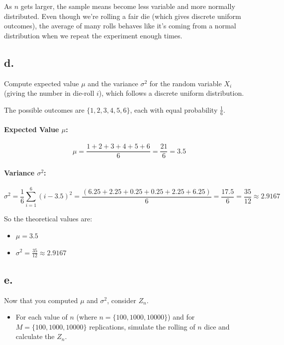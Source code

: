 \documentclass[
]{article}
\providecommand{\tightlist}{%
  \setlength{\itemsep}{0pt}\setlength{\parskip}{0pt}}
\begin{document}
As \(n\) gets larger, the sample means become less variable and more
normally distributed. Even though we're rolling a fair die (which gives
discrete uniform outcomes), the average of many rolls behaves like it's
coming from a normal distribution when we repeat the experiment enough
times.

\subsection{d.~}\label{d.-2}

Compute expected value \(\mu\) and the variance \(\sigma^2\) for the
random variable \(X_i\) (giving the number in die-roll \(i\)), which
follows a discrete uniform distribution.

The possible outcomes are \(\{1, 2, 3, 4, 5, 6\}\), each with equal
probability \(\frac{1}{6}\).

\paragraph{\texorpdfstring{Expected Value
\(\mu\):}{Expected Value \textbackslash mu:}}\label{expected-value-mu}

\[
\mu = \frac{1 + 2 + 3 + 4 + 5 + 6}{6} = \frac{21}{6} = 3.5
\]

\paragraph{\texorpdfstring{Variance
\(\sigma^2\):}{Variance \textbackslash sigma\^{}2:}}\label{variance-sigma2}

\[
\sigma^2 = \frac{1}{6} \sum_{i=1}^{6} (i - 3.5)^2 = \frac{(6.25 + 2.25 + 0.25 + 0.25 + 2.25 + 6.25)}{6} = \frac{17.5}{6} = \frac{35}{12} \approx 2.9167
\]

So the theoretical values are:

\begin{itemize}
\tightlist
\item
  \(\mu = 3.5\)
\item
  \(\sigma^2 = \frac{35}{12} \approx 2.9167\)
\end{itemize}

\subsection{e.}\label{e.-1}

Now that you computed \(\mu\) and \(\sigma^2\), consider \(Z_n\).

\begin{itemize}
\tightlist
\item
  For each value of \(n\) (where \(n=\{100,1000,10000\}\)) and for
  \(M=\{100,1000,10000\}\) replications, simulate the rolling of \(n\)
  dice and calculate the \(Z_n\).
\end{itemize}
\end{document}
